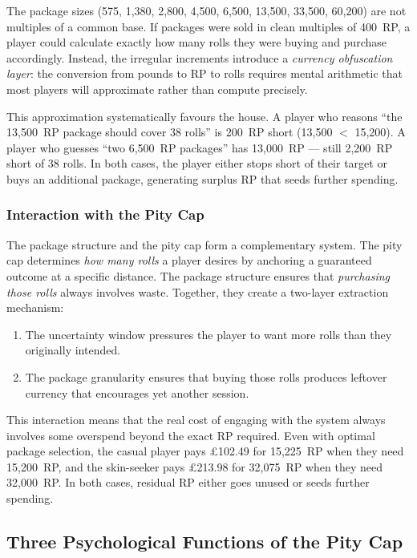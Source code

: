 \documentclass[11pt, a4paper]{article}
\begin{document}
The package sizes (575, 1{,}380, 2{,}800, 4{,}500, 6{,}500,
13{,}500, 33{,}500, 60{,}200) are not multiples of a common base.
If packages were sold in clean multiples of 400~RP, a player could
calculate exactly how many rolls they were buying and purchase
accordingly. Instead, the irregular increments introduce a
\emph{currency obfuscation layer}: the conversion from pounds to RP
to rolls requires mental arithmetic that most players will
approximate rather than compute precisely.

This approximation systematically favours the house. A player who
reasons ``the 13{,}500~RP package should cover 38 rolls'' is
200~RP short (13{,}500 $<$ 15{,}200). A player who guesses
``two 6{,}500~RP packages'' has 13{,}000~RP --- still 2{,}200~RP
short of 38 rolls. In both cases, the player either stops short of
their target or buys an additional package, generating surplus RP
that seeds further spending.

\subsubsection*{Interaction with the Pity Cap}

The package structure and the pity cap form a complementary system.
The pity cap determines \emph{how many rolls} a player desires by
anchoring a guaranteed outcome at a specific distance. The package
structure ensures that \emph{purchasing those rolls} always involves
waste. Together, they create a two-layer extraction mechanism:

\begin{enumerate}[nosep]
    \item The uncertainty window pressures the player to want more
          rolls than they originally intended.
    \item The package granularity ensures that buying those rolls
          produces leftover currency that encourages yet another
          session.
\end{enumerate}

\noindent This interaction means that the real cost of engaging with
the system always involves some overspend beyond the exact RP
required. Even with optimal package selection, the casual player
pays \pounds102.49 for 15{,}225~RP when they need 15{,}200~RP, and
the skin-seeker pays \pounds213.98 for 32{,}075~RP when they need
32{,}000~RP. In both cases, residual RP either goes unused or seeds
further spending.


\subsection{Three Psychological Functions of the Pity Cap}
\label{sec:synthesis-psychology}
\end{document}

